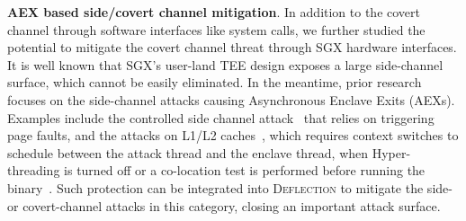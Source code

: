 \vspace{3pt}\noindent\textbf{AEX based side/covert channel mitigation}. 
In addition to the covert channel through software interfaces like system calls, we further studied the potential to mitigate the covert channel threat through SGX hardware interfaces.
It is well known that SGX's user-land TEE design exposes a large side-channel surface, which cannot be easily eliminated. In the meantime, prior research focuses on the side-channel attacks causing Asynchronous Enclave Exits (AEXs). Examples include the controlled side channel attack~\cite{xu2015controlled} that relies on triggering page faults, and the attacks on L1/L2 caches~\cite{wang2017leaky}, which requires context switches to schedule between the attack thread and the enclave thread, when Hyper-threading is turned off or a co-location test is performed before running the binary~\cite{chen2018racing}. Such protection can be integrated into \textsc{Deflection} to mitigate the side- or covert-channel attacks in this category, closing an important attack surface.




